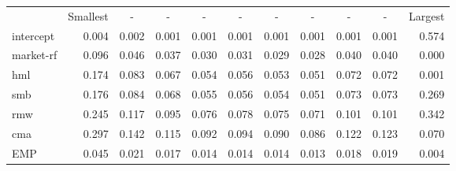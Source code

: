 \begin{tabular}{lrrrrrrrrrr}
      & \multicolumn{1}{l}{Smallest} & \multicolumn{1}{c}{-} & \multicolumn{1}{c}{-} & \multicolumn{1}{c}{-} & \multicolumn{1}{c}{-} & \multicolumn{1}{c}{-} & \multicolumn{1}{c}{-} & \multicolumn{1}{c}{-} & \multicolumn{1}{c}{-} & \multicolumn{1}{l}{Largest} \\
intercept & 0.004 & 0.002 & 0.001 & 0.001 & 0.001 & 0.001 & 0.001 & 0.001 & 0.001 & 0.574 \\
market-rf & 0.096 & 0.046 & 0.037 & 0.030 & 0.031 & 0.029 & 0.028 & 0.040 & 0.040 & 0.000 \\
hml   & 0.174 & 0.083 & 0.067 & 0.054 & 0.056 & 0.053 & 0.051 & 0.072 & 0.072 & 0.001 \\
smb   & 0.176 & 0.084 & 0.068 & 0.055 & 0.056 & 0.054 & 0.051 & 0.073 & 0.073 & 0.269 \\
rmw   & 0.245 & 0.117 & 0.095 & 0.076 & 0.078 & 0.075 & 0.071 & 0.101 & 0.101 & 0.342 \\
cma   & 0.297 & 0.142 & 0.115 & 0.092 & 0.094 & 0.090 & 0.086 & 0.122 & 0.123 & 0.070 \\
EMP   & 0.045 & 0.021 & 0.017 & 0.014 & 0.014 & 0.014 & 0.013 & 0.018 & 0.019 & 0.004 \\
\end{tabular}%
